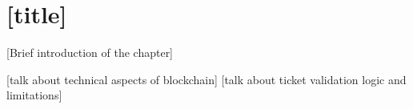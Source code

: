 \chapter{[title]}
 [Brief introduction of the chapter]


 [talk about technical aspects of blockchain]
 [talk about ticket validation logic and limitations]
